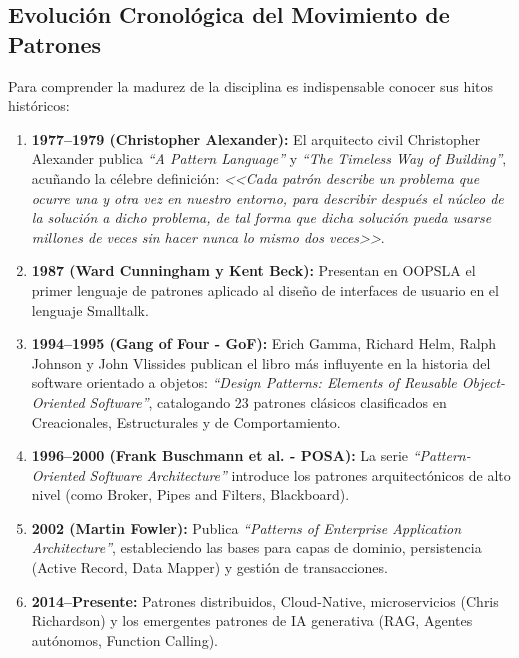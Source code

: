 \subsection{Evolución Cronológica del Movimiento de Patrones}

Para comprender la madurez de la disciplina es indispensable conocer sus hitos históricos:
\begin{enumerate}[leftmargin=1.5em]
  \item \textbf{1977--1979 (Christopher Alexander):} El arquitecto civil Christopher Alexander publica \emph{``A Pattern Language''} y \emph{``The Timeless Way of Building''}, acuñando la célebre definición: \emph{<<Cada patrón describe un problema que ocurre una y otra vez en nuestro entorno, para describir después el núcleo de la solución a dicho problema, de tal forma que dicha solución pueda usarse millones de veces sin hacer nunca lo mismo dos veces>>}.
  \item \textbf{1987 (Ward Cunningham y Kent Beck):} Presentan en OOPSLA el primer lenguaje de patrones aplicado al diseño de interfaces de usuario en el lenguaje Smalltalk.
  \item \textbf{1994--1995 (Gang of Four - GoF):} Erich Gamma, Richard Helm, Ralph Johnson y John Vlissides publican el libro más influyente en la historia del software orientado a objetos: \emph{``Design Patterns: Elements of Reusable Object-Oriented Software''}, catalogando 23 patrones clásicos clasificados en Creacionales, Estructurales y de Comportamiento.
  \item \textbf{1996--2000 (Frank Buschmann et al. - POSA):} La serie \emph{``Pattern-Oriented Software Architecture''} introduce los patrones arquitectónicos de alto nivel (como Broker, Pipes and Filters, Blackboard).
  \item \textbf{2002 (Martin Fowler):} Publica \emph{``Patterns of Enterprise Application Architecture''}, estableciendo las bases para capas de dominio, persistencia (Active Record, Data Mapper) y gestión de transacciones.
  \item \textbf{2014--Presente:} Patrones distribuidos, Cloud-Native, microservicios (Chris Richardson) y los emergentes patrones de IA generativa (RAG, Agentes autónomos, Function Calling).
\end{enumerate}

